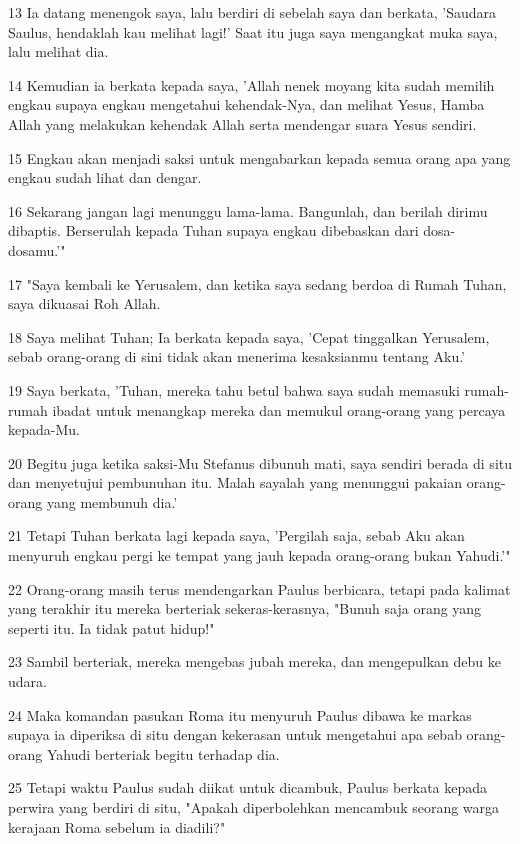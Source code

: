 \par 13 Ia datang menengok saya, lalu berdiri di sebelah saya dan berkata, 'Saudara Saulus, hendaklah kau melihat lagi!' Saat itu juga saya mengangkat muka saya, lalu melihat dia.
\par 14 Kemudian ia berkata kepada saya, 'Allah nenek moyang kita sudah memilih engkau supaya engkau mengetahui kehendak-Nya, dan melihat Yesus, Hamba Allah yang melakukan kehendak Allah serta mendengar suara Yesus sendiri.
\par 15 Engkau akan menjadi saksi untuk mengabarkan kepada semua orang apa yang engkau sudah lihat dan dengar.
\par 16 Sekarang jangan lagi menunggu lama-lama. Bangunlah, dan berilah dirimu dibaptis. Berserulah kepada Tuhan supaya engkau dibebaskan dari dosa-dosamu.'"
\par 17 "Saya kembali ke Yerusalem, dan ketika saya sedang berdoa di Rumah Tuhan, saya dikuasai Roh Allah.
\par 18 Saya melihat Tuhan; Ia berkata kepada saya, 'Cepat tinggalkan Yerusalem, sebab orang-orang di sini tidak akan menerima kesaksianmu tentang Aku.'
\par 19 Saya berkata, 'Tuhan, mereka tahu betul bahwa saya sudah memasuki rumah-rumah ibadat untuk menangkap mereka dan memukul orang-orang yang percaya kepada-Mu.
\par 20 Begitu juga ketika saksi-Mu Stefanus dibunuh mati, saya sendiri berada di situ dan menyetujui pembunuhan itu. Malah sayalah yang menunggui pakaian orang-orang yang membunuh dia.'
\par 21 Tetapi Tuhan berkata lagi kepada saya, 'Pergilah saja, sebab Aku akan menyuruh engkau pergi ke tempat yang jauh kepada orang-orang bukan Yahudi.'"
\par 22 Orang-orang masih terus mendengarkan Paulus berbicara, tetapi pada kalimat yang terakhir itu mereka berteriak sekeras-kerasnya, "Bunuh saja orang yang seperti itu. Ia tidak patut hidup!"
\par 23 Sambil berteriak, mereka mengebas jubah mereka, dan mengepulkan debu ke udara.
\par 24 Maka komandan pasukan Roma itu menyuruh Paulus dibawa ke markas supaya ia diperiksa di situ dengan kekerasan untuk mengetahui apa sebab orang-orang Yahudi berteriak begitu terhadap dia.
\par 25 Tetapi waktu Paulus sudah diikat untuk dicambuk, Paulus berkata kepada perwira yang berdiri di situ, "Apakah diperbolehkan mencambuk seorang warga kerajaan Roma sebelum ia diadili?"

